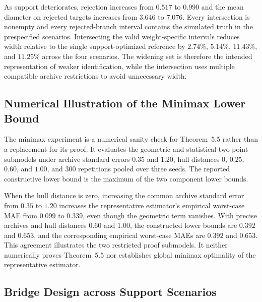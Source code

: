 \documentclass[11pt]{article}
\numberwithin{equation}{section}
\newcommand{\1}{\mathbf 1}
\begin{document}
As support deteriorates, rejection increases from $0.517$ to $0.990$ and the mean diameter on rejected targets increases from $3.646$ to $7.076$.  Every intersection is nonempty and every rejected-branch interval contains the simulated truth in the prespecified scenarios.  Intersecting the valid weight-specific intervals reduces width relative to the single support-optimized reference by $2.74\%$, $5.14\%$, $11.43\%$, and $11.25\%$ across the four scenarios.  The widening set is therefore the intended representation of weaker identification, while the intersection uses multiple compatible archive restrictions to avoid unnecessary width.


\subsection{Numerical Illustration of the Minimax Lower Bound}
\label{app:minimax-check}
\suppressfloats[t]

The minimax experiment is a numerical sanity check for Theorem~5.5 rather than a replacement for its proof.  It evaluates the geometric and statistical two-point submodels under archive standard errors $0.35$ and $1.20$, hull distances $0$, $0.25$, $0.60$, and $1.00$, and 300 repetitions pooled over three seeds.  The reported constructive lower bound is the maximum of the two component lower bounds.



When the hull distance is zero, increasing the common archive standard error from $0.35$ to $1.20$ increases the representative estimator's empirical worst-case MAE from $0.099$ to $0.339$, even though the geometric term vanishes.  With precise archives and hull distances $0.60$ and $1.00$, the constructed lower bounds are $0.392$ and $0.653$, and the corresponding empirical worst-case MAEs are $0.392$ and $0.653$.  This agreement illustrates the two restricted proof submodels.  It neither numerically proves Theorem~5.5 nor establishes global minimax optimality of the representative estimator.


\subsection{Bridge Design across Support Scenarios}
\label{app:bridge-design}
\suppressfloats[t]
\end{document}
